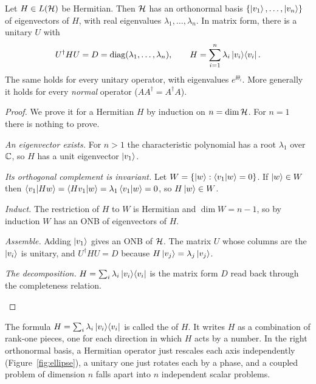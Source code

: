\begin{theorem}\label{thm:spectral}
  Let $H\in L(\mathcal{H})$ be Hermitian. Then $\mathcal{H}$ has an orthonormal basis $\{\left|v_1\right\rangle,\dots,\left|v_n\right\rangle\}$ of eigenvectors of $H$, with real eigenvalues $\lambda_1,\dots,\lambda_n$. In matrix form, there is a unitary $U$ with
  \[
    U^\dagger HU=D=\operatorname{diag}(\lambda_1,\dots,\lambda_n),\qquad H=\sum_{i=1}^n\lambda_i\left|v_i\right\rangle\!\left\langle v_i\right|.
  \]
  The same holds for every unitary operator, with eigenvalues $e^{\ii\theta_i}$. More generally it holds for every \emph{normal} operator ($AA^\dagger=A^\dagger A$).
\end{theorem}
\begin{proof}
  We prove it for a Hermitian $H$ by induction on $n=\dim\mathcal{H}$. For $n=1$ there is nothing to prove.
  \begin{steps}
    \item \emph{An eigenvector exists.} For $n>1$ the characteristic polynomial has a root $\lambda_1$ over $\mathbb{C}$, so $H$ has a unit eigenvector $\left|v_1\right\rangle$.
    \item \emph{Its orthogonal complement is invariant.} Let $W=\{\left|w\right\rangle:\left\langle v_1\middle|w\right\rangle=0\}$. If $\left|w\right\rangle\in W$ then $\left\langle v_1\middle|Hw\right\rangle=\left\langle Hv_1\middle|w\right\rangle=\lambda_1\left\langle v_1\middle|w\right\rangle=0$, so $H\left|w\right\rangle\in W$.
    \item \emph{Induct.} The restriction of $H$ to $W$ is Hermitian and $\dim W=n-1$, so by induction $W$ has an ONB of eigenvectors of $H$.
    \item \emph{Assemble.} Adding $\left|v_1\right\rangle$ gives an ONB of $\mathcal{H}$. The matrix $U$ whose columns are the $\left|v_i\right\rangle$ is unitary, and $U^\dagger HU=D$ because $H\left|v_j\right\rangle=\lambda_j\left|v_j\right\rangle$.
    \item \emph{The decomposition.} $H=\sum_i\lambda_i\left|v_i\right\rangle\!\left\langle v_i\right|$ is the matrix form $D$ read back through the completeness relation. \qedhere
  \end{steps}
\end{proof}

The formula $H=\sum_i\lambda_i\left|v_i\right\rangle\!\left\langle v_i\right|$ is called the  of $H$. It writes $H$ as a combination of rank-one pieces, one for each direction in which $H$ acts by a number. In the right orthonormal basis, a Hermitian operator just rescales each axis independently (Figure~\ref{fig:ellipse}), a unitary one just rotates each by a phase, and a coupled problem of dimension $n$ falls apart into $n$ independent scalar problems.


